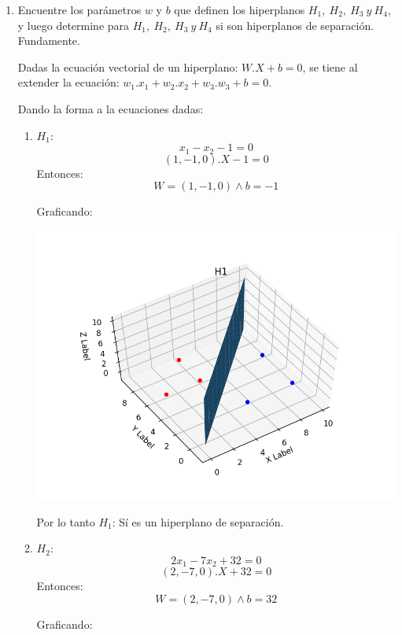 \documentclass[paper=a4, fontsize=11pt]{scrartcl}
\numberwithin{equation}{section}		%
\numberwithin{figure}{section}			%
\numberwithin{table}{section}				%
\begin{document}
\begin{enumerate}
    \item Encuentre  los parámetros $w$ y $b$ que definen los hiperplanos $H_1,\  H_2,\ H_3\ y\ H_4$, y luego determine para $H_1,\  H_2,\ H_3\ y\ H_4$ si son hiperplanos de separación. Fundamente.
    
    Dadas la ecuación vectorial de un hiperplano: $W.X + b = 0$, se tiene al extender la ecuación: $w_1.x_1 + w_2.x_2 + w_3.w_3 +b = 0$.
    
    Dando la forma a la ecuaciones dadas:
    
    \begin{enumerate}
        \item $H_1:$
                $$ x_1 - x_2 -1 = 0 $$
                $$ (1,-1,0).X - 1 =0 $$
                Entonces: $$W = (1,-1,0) \wedge b=-1$$
                
                Graficando:
                
                \includegraphics[scale=0.4]{S_H1}
                
                Por lo tanto $H_1$: Sí es un hiperplano de separación.
                
        \item $H_2:$
                $$ 2x_1 - 7x_2 +32 =0 $$
                $$ (2,-7,0).X +32 =0 $$
                Entonces: $$W=(2,-7,0) \wedge b=32$$
                
                Graficando:
                

\end{enumerate}
\end{enumerate}
\end{document}
